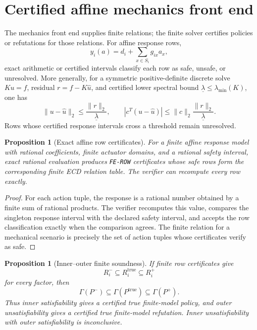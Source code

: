 \documentclass[11pt]{article}
\theoremstyle{plain}
\newtheorem{proposition}[theorem]{Proposition}
\theoremstyle{definition}
\theoremstyle{remark}
\begin{document}
\section{Certified affine mechanics front end}
\label{sec:mechanics-front-end}

The mechanics front end supplies finite relations; the finite solver certifies
policies or refutations for those relations.  For affine response rows,
\[
  y_i(a)=d_i+\sum_{x\in S_i}g_{ix}a_x,
\]
exact arithmetic or certified intervals classify each row as safe, unsafe, or
unresolved.  More generally, for a symmetric positive-definite discrete solve
\(Ku=f\), residual \(r=f-K\widehat u\), and certified lower spectral bound
\(\underline\lambda\le\lambda_{
\min}(K)\), one has
\[
  \|u-\widehat u\|_2\le \frac{\|r\|_2}{\underline\lambda},
  \qquad
  |c^T(u-\widehat u)|\le
  \|c\|_2\frac{\|r\|_2}{\underline\lambda}.
\]
Rows whose certified response intervals cross a threshold remain unresolved.

\begin{proposition}[Exact affine row certificates]
\label{prop:exact-affine-row-certificates}
For a finite affine response model with rational coefficients, finite actuator
domains, and a rational safety interval, exact rational evaluation produces
\texttt{FE-ROW} certificates whose safe rows form the corresponding finite ECD
relation table.  The verifier can recompute every row exactly.
\end{proposition}

\begin{proof}
For each action tuple, the response is a rational number obtained by a finite
sum of rational products.  The verifier recomputes this value, compares the
singleton response interval with the declared safety interval, and accepts the
row classification exactly when the comparison agrees.  The finite relation for
a mechanical scenario is precisely the set of action tuples whose certificates
verify as safe.
\end{proof}

\begin{proposition}[Inner--outer finite soundness]
If finite row certificates give
\[
  R_i^-\subseteq R_i^{\mathrm{true}}\subseteq R_i^+
\]
for every factor, then
\[
  \Gamma(P^-)\subseteq\Gamma(P^{\mathrm{true}})\subseteq\Gamma(P^+).
\]
Thus inner satisfiability gives a certified true finite-model policy, and outer
unsatisfiability gives a certified true finite-model refutation.  Inner
unsatisfiability with outer satisfiability is inconclusive.
\end{proposition}
\end{document}
